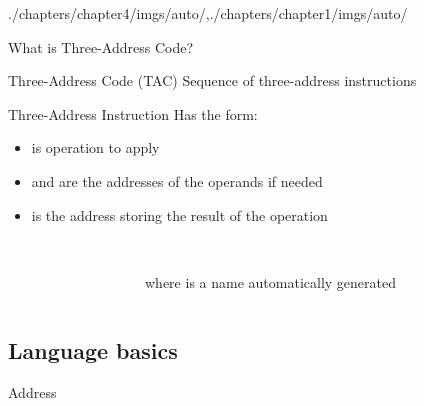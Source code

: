 \begin{graphicspathcontext}{{./chapters/chapter4/imgs/auto/},{./chapters/chapter1/imgs/auto/}}
\begin{bibunit}[apalike]
\begin{frame}[t]{{What is} Three-Address Code?}
	\smaller
	\begin{definitionblock}{Three-Address Code (TAC)}
		Sequence of three-address instructions
	\end{definitionblock}
	\begin{definitionblock}{Three-Address Instruction}
		Has the form:  \\
		\begin{itemize}
			\item {} is operation to apply
			\item {} and  are the addresses of the operands if needed
			\item {} is the address storing the result of the operation
		\end{itemize}
	\end{definitionblock}
	\begin{example}
		\begin{columns}
			\begin{column}{.2\linewidth}
			\end{column}
			\begin{column}{.5\linewidth}
				\begin{tac}[\linewidth]
				\end{tac} \\
				where  is a name automatically generated
			\end{column}
		\end{columns}
	\end{example}
\end{frame}

\subsection{Language basics}
\subsectiontableofcontentslide

\begin{frame}{Address}
	\vspace{.5cm}
	\hfill
	\hfill
\end{frame}


\end{bibunit}
\end{graphicspathcontext}
